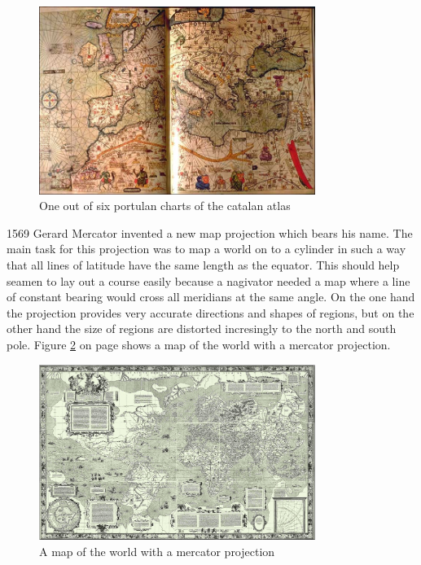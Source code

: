 \begin{figure}[!htb]
\centering
\includegraphics[width=0.8\textwidth,keepaspectratio]{images/history/catalan-atlas.jpg}
\caption[
    One out of six portulan charts of the catalan atlas, Urldate: 07.2016 \newline
\small\texttt{\url{http://datavis.ca/milestones//admin/uploads/images/CatalanE.jpg}}
]{One out of six portulan charts of the catalan atlas}
\label{fig:catalan-atlas}
\end{figure}

1569 Gerard Mercator invented a new map projection which bears his name. The main task for this projection was to map a world on to a cylinder in such a way that all lines of latitude have the same length as the equator. This should help seamen to lay out a course easily because a nagivator needed a map where a line of constant bearing would cross all meridians at the same angle. On the one hand the projection provides very accurate directions and shapes of regions, but on the other hand the size of regions are distorted incresingly to the north and south pole. Figure \ref{fig:mercator} on page \pageref{fig:mercator} shows a map of the world with a mercator projection.

\begin{figure}[!htb]
\centering
\includegraphics[width=0.8\textwidth,keepaspectratio]{images/history/mercator.png}
\caption[
    A map of the world with a mercator projection, Urldate: 07.2016 \newline
\small\texttt{\url{https://upload.wikimedia.org/wikipedia/commons/b/b2/Mercator_1569.png}}
]{A map of the world with a mercator projection}
\label{fig:mercator}
\end{figure}

